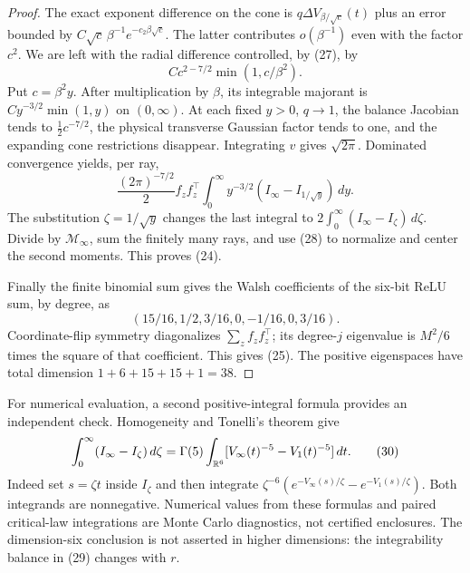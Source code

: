 \documentclass[11pt]{article}
\begin{document}
\begin{proof}
The exact exponent difference on the cone is
$q\Delta V_{\beta/\sqrt c}(t)$ plus an error bounded by
$C\sqrt c\,\beta^{-1}e^{-c_2\beta\sqrt c}$. The latter contributes
$o(\beta^{-1})$ even with the factor $c^2$. We are left with the
radial difference controlled, by (27), by
\[
                         Cc^{2-7/2}\min(1,c/\beta^2).   \tag{29}
\]
Put $c=\beta^2 y$. After multiplication by $\beta$, its integrable
majorant is $Cy^{-3/2}\min(1,y)$ on $(0,\infty)$.
At each fixed $y>0$, $q\to1$, the balance Jacobian tends to
$\tfrac12c^{-7/2}$, the physical transverse Gaussian factor tends
to one, and the expanding cone restrictions disappear. Integrating
$v$ gives $\sqrt{2\pi}$. Dominated convergence yields, per ray,
\[
 \frac{(2\pi)^{-7/2}}2 f_zf_z^\top
            \int_0^\infty y^{-3/2}(I_\infty-I_{1/\sqrt y})\,dy.
\]
The substitution $\zeta=1/\sqrt y$ changes the last integral to
$2\int_0^\infty(I_\infty-I_\zeta)\,d\zeta$.
Divide by $\mathcal M_\infty$, sum the finitely many rays, and use
(28) to normalize and center the second moments. This proves (24).

Finally the finite binomial sum gives the Walsh coefficients of the
six-bit ReLU sum, by degree, as
\[
                 (15/16,1/2,3/16,0,-1/16,0,3/16).
\]
Coordinate-flip symmetry diagonalizes $\sum_zf_zf_z^\top$; its
degree-$j$ eigenvalue is $M^2/6$ times the square of that coefficient.
This gives (25). The positive eigenspaces have total dimension
$1+6+15+15+1=38$.
\end{proof}

For numerical evaluation, a second positive-integral formula provides
an independent check. Homogeneity and Tonelli's theorem give
\[
 \int_0^\infty(I_\infty-I_\zeta)\,d\zeta
 =\Gamma(5)\int_{\mathbb R^6}
       [V_\infty(t)^{-5}-V_1(t)^{-5}]\,dt.             \tag{30}
\]
Indeed set $s=\zeta t$ inside $I_\zeta$ and then integrate
$\zeta^{-6}(e^{-V_\infty(s)/\zeta}-e^{-V_1(s)/\zeta})$.
Both integrands are nonnegative. Numerical values from these formulas
and paired critical-law integrations are Monte Carlo diagnostics, not
certified enclosures. The dimension-six conclusion is not asserted in
higher dimensions: the integrability balance in (29) changes with $r$.
\end{document}
